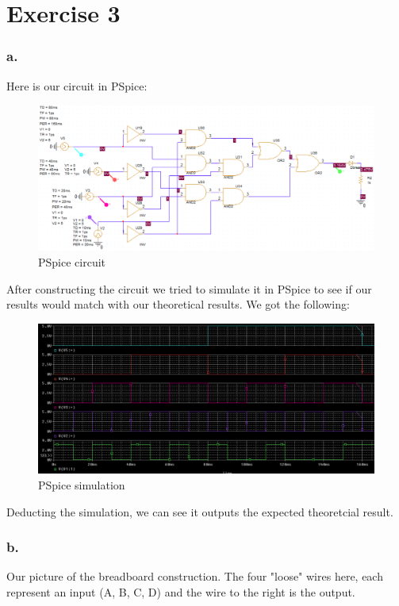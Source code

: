 \documentclass{article}
\begin{document}
\pagebreak

 \addtocounter{section}{1}
\section*{Exercise 3}
\subsubsection*{a.}  %
Here is our circuit in PSpice: 
\begin{figure}[h]
  \centering
  \caption{PSpice circuit}\label{fig:PSpice}\hypertarget{PSpice}{\space}
  \includegraphics[width=0.85\linewidth, keepaspectratio=true]{SimulationCircuit}
\end{figure}

\noindent After constructing the circuit we tried to simulate it in PSpice to see if our results would match with our theoretical results. We got the following: \\
\begin{figure}[h]
  \centering
  \caption{PSpice simulation}\label{fig:PSpice}\hypertarget{PSpice}{\space}
  \includegraphics[width=0.85\linewidth, keepaspectratio=true]{SimulationResult}
\end{figure}

\noindent Deducting the simulation, we can see it outputs the expected theoretcial result.


\pagebreak
\subsubsection*{b.} 
Our picture of the breadboard construction. The four "loose" wires here, each represent an input (A, B, C, D) and the wire to the right is the output.
\end{document}
